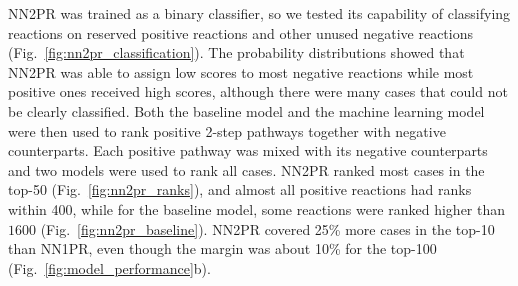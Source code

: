\documentclass{article}
\begin{document}
NN2PR was trained as a binary classifier, so we tested its capability of classifying reactions on reserved positive reactions and other unused negative reactions (Fig.~\ref{fig:nn2pr_classification}). 
The probability distributions showed that NN2PR was able to assign low scores to most negative reactions while most positive ones received high scores, although there were many cases that could not be clearly classified.
Both the baseline model and the machine learning model were then used to rank positive 2-step pathways together with negative counterparts.
Each positive pathway was mixed with its negative counterparts and two models were used to rank all cases.
NN2PR ranked most cases in the top-50 (Fig.~\ref{fig:nn2pr_ranks}), and almost all positive reactions had ranks within 400, while for the baseline model, some reactions were ranked higher than $1600$ (Fig.~\ref{fig:nn2pr_baseline}).
NN2PR covered 25\% more cases in the top-10 than NN1PR, even though the margin was about 10\% for the top-100 (Fig.~\ref{fig:model_performance}b). 
\end{document}
